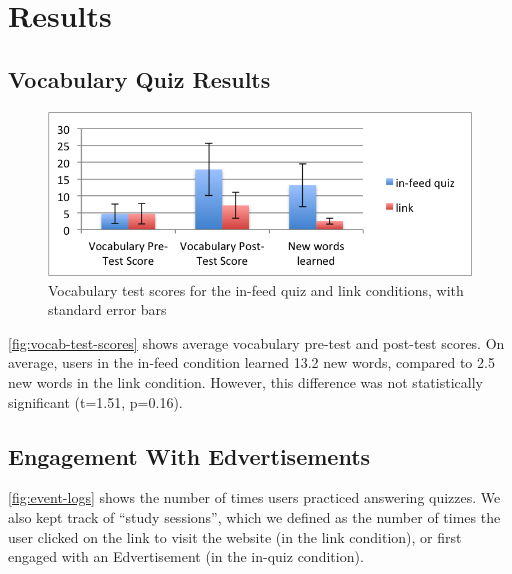 \documentclass{sigchi}
\begin{document}

\section{Results}

\subsection{Vocabulary Quiz Results}

\begin{figure}
\centering
\includegraphics[width=1.0\columnwidth]{vocab-test-scores}
\caption{Vocabulary test scores for the in-feed quiz and link conditions, with standard error bars}
\label{fig:vocab-test-scores}
\end{figure}

\autoref{fig:vocab-test-scores} shows average vocabulary pre-test and post-test scores. On average, users in the in-feed condition learned 13.2 new words, compared to 2.5 new words in the link condition. However, this difference was not statistically significant (t=1.51, p=0.16).

\subsection{Engagement With Edvertisements}

\autoref{fig:event-logs} shows the number of times users practiced answering quizzes. We also kept track of ``study sessions'', which we defined as the number of times the user clicked on the link to visit the website (in the link condition), or first engaged with an Edvertisement (in the in-quiz condition). %
\end{document}
